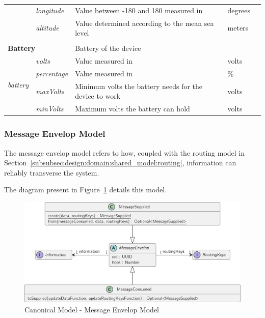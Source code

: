 \begin{landscape}
\begin{longtable}{cllll}
                                         & \textit{longitude}                 & Value between -180 and 180 measured in                 & degrees                        &  \\
                                         & \textit{altitude}                  & Value determined according to the mean sea level       & meters                         &  \\ [0.4em] \cline{1-4}
   \\[-0.85em]
   \multicolumn{2}{l}{\textbf{Battery}}                                       & \multicolumn{2}{l}{Battery of the device}                                               &  \\
   \multirow{4}{*}{\textit{battery}}     & \textit{volts}                     & Value measured in                                      & volts                          &  \\
                                         & \textit{percentage}                & Value measured in                                      & \%                             &  \\
                                         & \textit{maxVolts}                  & Minimum volts the battery needs for the device to work & volts                          &  \\
                                         & \textit{minVolts}                  & Maximum volts the battery can hold                     & volts                          &  \\ [0.4em] \cline{1-4}
   \end{longtable}
\end{landscape}

\subsubsection{Message Envelop Model}
\label{subsubsec:design:domain:shared_model:message}

The message envelop model refers to how, coupled with the routing model in Section~\ref{subsubsec:design:domain:shared_model:routing}, information can reliably transverse the system.

The diagram present in Figure~\ref{fig:design:domain:shared_model:messsage:diagram} details this model.

\begin{figure}[H]
   \centering
   \includegraphics[page=1,width=0.8\columnwidth]{assets/diagrams/design/domain/message-envelop-model.pdf}
  \caption[Canonical Model - Message Envelop Model]{Canonical Model - Message Envelop Model}
  \label{fig:design:domain:shared_model:messsage:diagram}
\end{figure}

